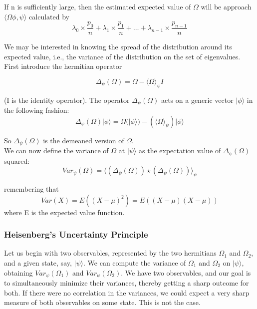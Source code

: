 \documentclass{article}
\begin{document}
If n is sufficiently large, then the estimated expected value of $\Omega$ will be approach $\langle\Omega\phi, \psi\rangle$ calculated by
\begin{equation}
    \lambda_0 \times \frac{p_0}{n} +  \lambda_1 \times \frac{p_1}{n} + \ldots + \lambda_{n-1} \times \frac{p_{n-1}}{n}
\end{equation}

We may be interested in knowing the spread of the distribution around its expected value, i.e., the variance of the distribution on the set of eigenvalues. First introduce the hermitian operator

\begin{equation}
    \Delta_\psi(\Omega) = \Omega - \langle\Omega\rangle_\psi I
\end{equation}

(I is the identity operator). The operator $\Delta_\psi(\Omega)$ acts on a generic vector $|\phi\rangle$ in the following fashion: 
\begin{equation}
    \Delta_\psi(\Omega)|\phi\rangle = \Omega(|\phi\rangle) - (\langle\Omega\rangle_\psi)|\phi\rangle
\end{equation}

So $\Delta_\psi(\Omega)$ is the demeaned version of $\Omega$.\\

We can now define the variance of $\Omega$ at $|\psi\rangle$ as the expectation value of $\Delta_\psi(\Omega)$ squared:
\begin{equation}
    Var_\psi(\Omega) = \langle 
    (\Delta_\psi(\Omega))
    \star
    (\Delta_\psi(\Omega))
    \rangle_\psi
\end{equation}

remembering that
\begin{equation}
Var(X) = E((X - \mu)^2) = E((X-\mu)(X-\mu))
\end{equation}
where E is the expected value function.

\subsubsection*{Heisenberg's Uncertainty Principle}
Let us begin with two observables, represented by the two hermitians $\Omega_1$ and $\Omega_2$, and a given state, say, $|\psi\rangle$. We can compute the variance of $\Omega_1$ and $\Omega_2$ on $|\psi\rangle$, obtaining $Var_\psi(\Omega_1)$ and $Var_\psi(\Omega_2)$. We have two observables, and our goal is to simultaneously minimize their variances, thereby getting a sharp outcome for both. 
If there were no correlation in the variances, we could expect a very sharp measure of both observables on some state. This is not the case.\\
\end{document}
